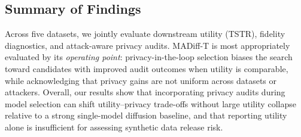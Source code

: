 \documentclass[preprint,12pt]{elsarticle}
\begin{document}
\subsection{Summary of Findings}\label{sec:results_summary}
Across five datasets, we jointly evaluate downstream utility (TSTR), fidelity diagnostics, and attack-aware privacy audits. MADiff-T is most appropriately evaluated by its \emph{operating point}: privacy-in-the-loop selection biases the search toward candidates with improved audit outcomes when utility is comparable, while acknowledging that privacy gains are not uniform across datasets or attackers. Overall, our results show that incorporating privacy audits during model selection can shift utility--privacy trade-offs without large utility collapse relative to a strong single-model diffusion baseline, and that reporting utility alone is insufficient for assessing synthetic data release risk.
\end{document}
